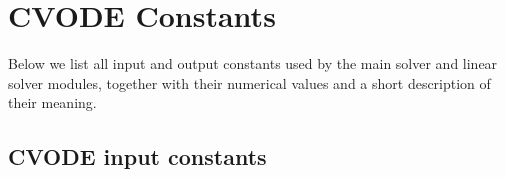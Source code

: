 \chapter{CVODE Constants}\label{c:constants}

Below we list all input and output constants used by the main solver and 
linear solver modules, together with their numerical values and a short
description of their meaning.


\newlength{\tcolone}
\newlength{\tcoltwo}
\settowidth{\tcoltwo}{-109}
\newlength{\tcolthree}
\setlength{\tcolthree}{\textwidth}
\addtolength{\tcolthree}{-0.5in}
\addtolength{\tcolthree}{-\tcolone}
\addtolength{\tcolthree}{-\tcoltwo}

\tablefirsthead{}
\tablehead{}
\tabletail{}
\tablelasttail{}


\section{CVODE input constants}\label{s:cvode_in_constants}

